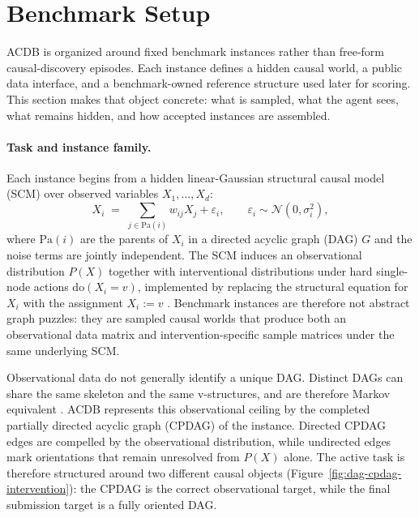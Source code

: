 \section{Benchmark Setup}
\label{sec:benchmark}

ACDB is organized around fixed benchmark instances rather than free-form causal-discovery episodes. Each instance defines a hidden causal world, a public data interface, and a benchmark-owned reference structure used later for scoring. This section makes that object concrete: what is sampled, what the agent sees, what remains hidden, and how accepted instances are assembled.

\paragraph{Task and instance family.} Each instance begins from a hidden linear-Gaussian structural causal model (SCM) over observed variables $X_1, \dots, X_d$:
\begin{equation}
X_i \;=\; \sum_{j \in \mathrm{Pa}(i)} w_{ij} X_j + \varepsilon_i,
\qquad \varepsilon_i \sim \mathcal{N}(0, \sigma_i^2),
\label{eq:linear-gaussian}
\end{equation}
where $\mathrm{Pa}(i)$ are the parents of $X_i$ in a directed acyclic graph (DAG) $G$ and the noise terms are jointly independent. The SCM induces an observational distribution $P(X)$ together with interventional distributions under hard single-node actions $\mathrm{do}(X_i = v)$, implemented by replacing the structural equation for $X_i$ with the assignment $X_i := v$ \citep{spirtes2000causation,eberhardt2005interventions}. Benchmark instances are therefore not abstract graph puzzles: they are sampled causal worlds that produce both an observational data matrix and intervention-specific sample matrices under the same underlying SCM.

Observational data do not generally identify a unique DAG. Distinct DAGs can share the same skeleton and the same v-structures, and are therefore Markov equivalent \citep{verma1990equivalence,andersson1997characterization}. ACDB represents this observational ceiling by the completed partially directed acyclic graph (CPDAG) of the instance. Directed CPDAG edges are compelled by the observational distribution, while undirected edges mark orientations that remain unresolved from $P(X)$ alone. The active task is therefore structured around two different causal objects (Figure~\ref{fig:dag-cpdag-intervention}): the CPDAG is the correct observational target, while the final submission target is a fully oriented DAG.

